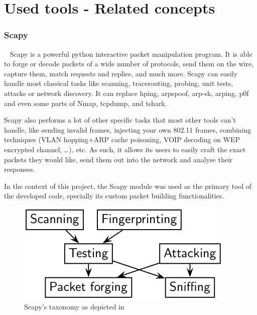 \section{Used tools - Related concepts}

\subsubsection{Scapy}

~\newline
Scapy is a powerful python interactive packet manipulation program. 
It is able to forge or decode packets of a wide number of protocols, send them on the wire, capture them, match requests and replies, and much more. 
Scapy can easily handle most classical tasks like scanning, tracerouting, probing, unit tests, attacks or network discovery. 
It can replace hping, arpspoof, arp-sk, arping, p0f and even some parts of Nmap,
tcpdump, and tshark.

Scapy also performs a lot of other specific tasks that most other tools can’t 
handle, like sending invalid frames, injecting your own 802.11 frames, 
combining techniques (VLAN hopping+ARP cache poisoning, VOIP decoding on WEP 
encrypted channel, …), etc.
As such, it allows its users to easily craft the exact packets they would like,
send them out into the network and analyse their responses.

In the context of this project, the Scapy module was used as the primary tool 
of the developed code, specially its custom packet building functionalities.


\begin{figure}[h!]
    \centering
    \includegraphics[width=1\linewidth,keepaspectratio]{taxonomy.png}
    \caption{Scapy's taxonomy as depicted in \cite{scapy}}
    \label{fig:taxonomy}
\end{figure}
\FloatBarrier

~
